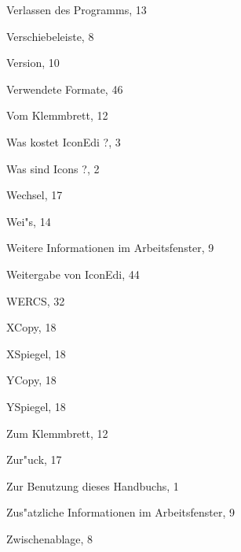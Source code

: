 \begin{theindex}
  \indexspace

  \item Verlassen des Programms, 13
  \item Verschiebeleiste, 8
  \item Version, 10
  \item Verwendete Formate, 46
  \item Vom Klemmbrett, 12

  \indexspace

  \item Was kostet IconEdi ?, 3
  \item Was sind Icons ?, 2
  \item Wechsel, 17
  \item Wei"s, 14
  \item Weitere Informationen im Arbeitsfenster, 9
  \item Weitergabe von IconEdi, 44
  \item WERCS, 32

  \indexspace

  \item XCopy, 18
  \item XSpiegel, 18

  \indexspace

  \item YCopy, 18
  \item YSpiegel, 18

  \indexspace

  \item Zum Klemmbrett, 12
  \item Zur"uck, 17
  \item Zur Benutzung dieses Handbuchs, 1
  \item Zus"atzliche Informationen im Arbeitsfenster, 9
  \item Zwischenablage, 8

\end{theindex}

\fi




